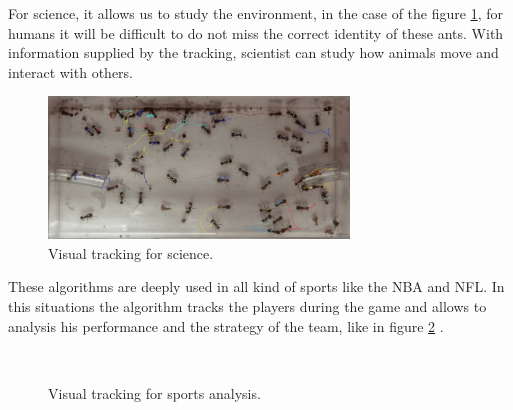 For science, it allows us to study the environment, in the case of the figure \ref{introTracking2}, for humans it will be difficult to do not miss the correct identity of these ants. With information supplied by the tracking, scientist can study how animals move and interact with others.

\begin{figure}[H]
\centering         
\includegraphics[width=8cm]{aplicaciones/Seleccio_007.png}
\caption{Visual tracking for science.} \label{introTracking2}
\end{figure}

These algorithms are deeply used in all kind of sports like the NBA and NFL. In this situations the algorithm tracks the players during the game and allows to analysis his performance and the strategy of the team, like in figure \ref{introTracking3} .

\begin{figure}[H]
	
\centering

\\


\caption{Visual tracking for sports analysis.}
\label{introTracking3}
\end{figure}

